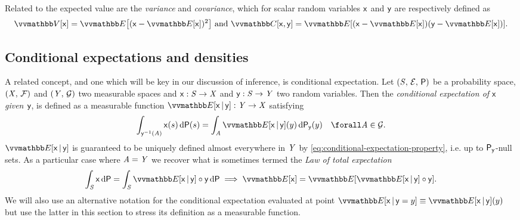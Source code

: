Related to the expected value are the \emph{variance} and \emph{covariance}, which for scalar random variables $\mathsf{x}$ and $\mathsf{y}$ are respectively defined as
\begin{equation}\label{eq:variance-definition}
  \var{\rvar{x}} = \expc{(\rvar{x} - \expc{\rvar{x}})^2}
  ~\textrm{and}~
  \cov{\rvar{x}, \rvar{y}} = \expc{(\rvar{x} - \expc{\rvar{x}})(\rvar{y} - \expc{\rvar{x}})}.
\end{equation}

\subsection{Conditional expectations and densities}

A related concept, and one which will be key in our discussion of inference, is conditional expectation. Let $(\mathit{S},\,\mathcal{E},\,\mathsf{P})$ be a probability space, $(\mathit{X},\,\mathcal{F})$ and $(\mathit{Y},\,\mathcal{G})$ two measurable spaces and $\mathsf{x} : \mathit{S} \to \mathit{X}$ and $\mathsf{y} : \mathit{S} \to \mathit{Y}$ two random variables. Then the \emph{conditional expectation of $\mathsf{x}$ given $\mathsf{y}$}, is defined as a measurable function $\expc{\rvar{x}\gvn\rvar{y}} : \set{Y} \to \set{X}$ satisfying
\begin{equation}\label{eq:conditional-expectation-property}
  \int_{\rvar{y}^{-1}(\set{A})} \rvar{x}(s) \,\dr\probability(s) =
  \int_{\set{A}} \expc{\rvar{x}\gvn\rvar{y}}(y) \,\dr\prob{\rvar{y}}(y)
  \quad \forall \set{A} \in \sset{G}.
\end{equation}
$\expc{\rvar{x}\gvn\rvar{y}}$ is guaranteed to be uniquely defined almost everywhere in $\mathit{Y}$ by \eqref{eq:conditional-expectation-property}, i.e. up to $\mathsf{P}_{\mathsf{y}}$-null sets. As a particular case where $\mathit{A} = \mathit{Y}$ we recover what is sometimes termed the \emph{Law of total expectation}
\begin{equation}\label{eq:law-of-total-expectation}
  \int_{\set{S}} \rvar{x} \,\dr\probability =
  \int_{\set{S}} \expc{\rvar{x}\gvn\rvar{y}} \circ \rvar{y} \,\dr\probability
   \implies
  \expc{\rvar{x}} =
  \expc{\expc{\rvar{x}\gvn\rvar{y}}\circ\rvar{y}}.
\end{equation}
We will also use an alternative notation for the conditional expectation evaluated at point $\expc{\rvar{x}\gvn\rvar{y} = y} \equiv \expc{\rvar{x}\gvn\rvar{y}}(y)$ but use the latter in this section to stress its definition as a measurable function.


